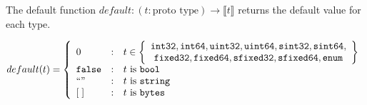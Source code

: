 \begin{definition}
  The default function
  $default: (t:\text{proto type}) \rightarrow \llbracket t \rrbracket$ returns the default
  value for each type.
  
  \[ default(t) = \left\{ 
    \begin{array}{l@{\quad:\quad}l}
      0 & t \in \left\{\begin{array}{c}
        \mathtt{int32}, \mathtt{int64}, \mathtt{uint32},
        \mathtt{uint64}, \mathtt{sint32}, \mathtt{sint64}, \\ \mathtt{fixed32},
        \mathtt{fixed64}, \mathtt{sfixed32}, \mathtt{sfixed64}, \mathtt{enum}
      \end{array}\right\} \\
      \mathtt{false} & t \text{ is } \mathtt{bool} \\
      ``" & t \text{ is } \mathtt{string} \\
      \hspace{0pt}[\;] & t \text{ is } \mathtt{bytes}
    \end{array}\right.
  \]
\end{definition}

